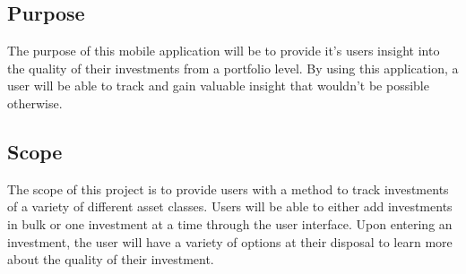 \documentclass[onecolumn, draftclsnofoot,10pt, compsoc]{IEEEtran}
\begin{document}
\subsection{Purpose}
The purpose of this mobile application will be to provide it's users insight into the quality of their investments from a portfolio level. By using this application, a user will be able to track and gain valuable insight that wouldn't be possible otherwise.

\subsection{Scope}
The scope of this project is to provide users with a method to track investments of a variety of different asset classes. Users will be able to either add investments in bulk or one investment at a time through the user interface. Upon entering an investment, the user will have a variety of options at their disposal to learn more about the quality of their investment.
\end{document}
